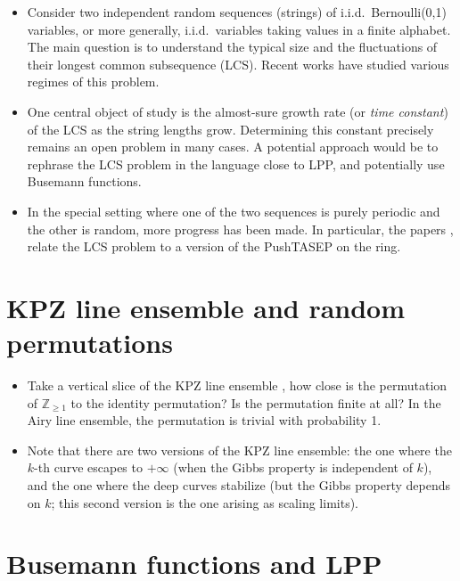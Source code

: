 \documentclass{article}
\theoremstyle{definition}
\begin{document}
\begin{itemize}
\item
Consider two independent random sequences (strings) of i.i.d.\ Bernoulli(0,1) variables, or more generally, i.i.d.\ variables taking values in a finite alphabet. The main question is to understand the typical size and the fluctuations of their longest common subsequence (LCS). Recent works have studied various regimes of this problem.

\item One central object of study is the almost-sure growth rate (or \emph{time constant}) of the LCS as the string lengths grow. Determining this constant precisely remains an open problem in many cases.
	A potential approach would be to rephrase the LCS problem in the language close to LPP, and potentially use
	Busemann functions.

\item In the special setting where one of the two sequences is purely periodic and the other is random, more progress has been made. In particular, the papers
\cite{bukh2019periodic}, \cite{briggs2024frogs}
relate the LCS problem to a version of the
PushTASEP on the ring.
\end{itemize}


\section{KPZ line ensemble and random permutations}

\begin{itemize}
    \item Take a vertical slice of the KPZ line ensemble \cite{CorwinHammond2013}, how close is the permutation of $\mathbb{Z}_{\ge1}$ to the identity permutation? Is the permutation finite at all? In the Airy line ensemble, the permutation is trivial with probability 1.
		\item Note that there are two versions of the KPZ line ensemble: the one where the $k$-th curve escapes to $+\infty$ (when the Gibbs property is independent of $k$), and the one where the deep curves stabilize (but the Gibbs property depends on $k$; this second version is the one arising as scaling limits).
\end{itemize}



\section{Busemann functions and LPP}
\end{document}
